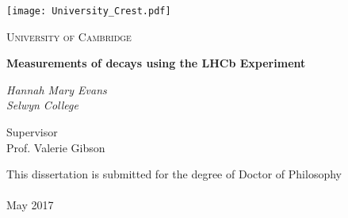 \begin{titlepage}
  \centering
  \texttt{[image: University\_Crest.pdf]}\par\vspace{1cm}
  {\scshape\LARGE  University of Cambridge \par}
  \vspace{1cm}
  \vspace{1.5cm}
  {\LARGE\bfseries Measurements of  decays using the LHCb Experiment \par}
  \vspace{2cm}
  {\Large\itshape Hannah Mary Evans\\
    Selwyn College\par}
  \vfill
  {\large
  Supervisor  \\
  Prof. Valerie Gibson
  }
  \vfill

  {\large This dissertation is submitted for the degree of Doctor of Philosophy \\
\\
May 2017}
\end{titlepage}
